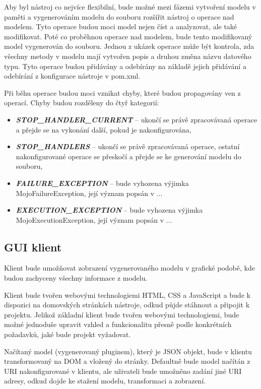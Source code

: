 \documentclass[11pt,twoside,a4paper]{book}
\begin{document}
Aby byl nástroj co nejvíce flexibilní, bude možné mezi fázemi vytvoření modelu v paměti a
vygenerováním modelu do souboru rozšířit nástroj o operace nad modelem. Tyto operace
budou moci model nejen číst a analyzovat, ale také modifikovat. Poté co proběhnou operace
nad modelem, bude tento modifikovaný model vygenerován do souboru. Jednou z ukázek
operace může být kontrola, zda všechny metody v modelu mají vytvořen popis a druhou
změna názvu datového typu. Tyto operace budou přidávány a odebírány na základě jejich
přidávání a odebírání z konfigurace nástroje v pom.xml.

Při běhu operace budou moci vznikat chyby, které budou propagovány ven z operací. Chyby
budou rozděleny do čtyř kategorií:

\begin{itemize}
  \item \textbf{\textit{STOP\_HANDLER\_CURRENT}} – ukončí se právě zpracovávaná operace a přejde
  se na vykonání další, pokud je nakonfigurována,
  \item \textbf{\textit{STOP\_HANDLERS}} – ukončí se právě
  zpracovávaná operace, ostatní nakonfigurované operace se přeskočí a přejde se ke generování modelu do souboru,
  \item \textbf{\textit{FAILURE\_EXCEPTION}} – bude
  vyhozena výjimka MojoFailureException, její význam popsán v ...
  \item \textbf{\textit{EXECUTION\_EXCEPTION}} – bude
  vyhozena výjimka MojoExecutionException, její význam popsán v ...
\end{itemize}

\subsection{GUI klient}

Klient bude umožňovat zobrazení vygenerovaného modelu v grafické podobě, kde budou
zachyceny všechny informace z modelu.

Klient bude tvořen webovými technologiemi HTML, CSS a JavaScript a bude k dispozici na
domovských stránkách nástroje, odkud půjde stáhnout a připojit k projektu. Jelikož základní
klient bude tvořen webovými technologiemi, bude možné jednoduše upravit vzhled a
funkcionalitu přesně podle konkrétních požadavků, jaké bude projekt vyžadovat.

Načítaný model (vygenerovaný pluginem), který je JSON objekt, bude v klientu
transformovaný na DOM a vložený do stránky. Defaultně bude model načítán z URI
nakonfigurované v klientu, ale uživateli bude umožněno zadání jiné URI adresy, odkud dojde
ke stažení modelu, transformaci a zobrazení.
\end{document}
